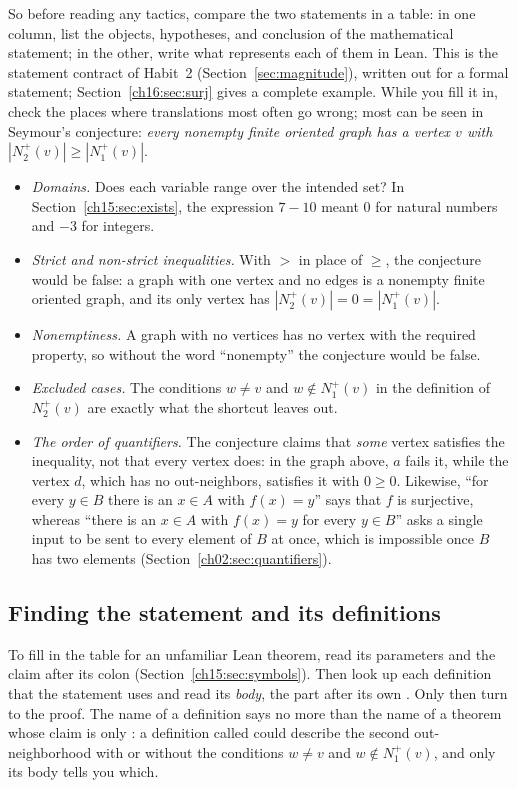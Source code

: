 So before reading any tactics, compare the two statements in a table: in one column, list the objects, hypotheses, and conclusion of the mathematical statement; in the other, write what represents each of them in Lean. This is the statement contract of Habit~2 (Section~\ref{sec:magnitude}), written out for a formal statement; Section~\ref{ch16:sec:surj} gives a complete example. While you fill it in, check the places where translations most often go wrong; most can be seen in Seymour's conjecture: \emph{every nonempty finite oriented graph has a vertex $v$ with $|N_2^+(v)|\ge|N_1^+(v)|$}.
\begin{itemize}
\item \emph{Domains.} Does each variable range over the intended set? In Section~\ref{ch15:sec:exists}, the expression $7-10$ meant $0$ for natural numbers and $-3$ for integers.
\item \emph{Strict and non-strict inequalities.} With $>$ in place of $\ge$, the conjecture would be false: a graph with one vertex and no edges is a nonempty finite oriented graph, and its only vertex has $|N_2^+(v)|=0=|N_1^+(v)|$.
\item \emph{Nonemptiness.} A graph with no vertices has no vertex with the required property, so without the word ``nonempty'' the conjecture would be false.
\item \emph{Excluded cases.} The conditions $w\ne v$ and $w\notin N_1^+(v)$ in the definition of $N_2^+(v)$ are exactly what the shortcut leaves out.
\item \emph{The order of quantifiers.} The conjecture claims that \emph{some} vertex satisfies the inequality, not that every vertex does: in the graph above, $a$ fails it, while the vertex $d$, which has no out-neighbors, satisfies it with $0\ge0$. Likewise, ``for every $y\in B$ there is an $x\in A$ with $f(x)=y$'' says that $f$ is surjective, whereas ``there is an $x\in A$ with $f(x)=y$ for every $y\in B$'' asks a single input to be sent to every element of $B$ at once, which is impossible once $B$ has two elements (Section~\ref{ch02:sec:quantifiers}).
\end{itemize}

\subsection*{Finding the statement and its definitions}
To fill in the table for an unfamiliar Lean theorem, read its parameters and the claim after its colon (Section~\ref{ch15:sec:symbols}). Then look up each definition that the statement uses and read its \emph{body}, the part after its own \code{:=}. Only then turn to the proof. The name of a definition says no more than the name  of a theorem whose claim is only : a definition called  could describe the second out-neighborhood with or without the conditions $w\ne v$ and $w\notin N_1^+(v)$, and only its body tells you which.
